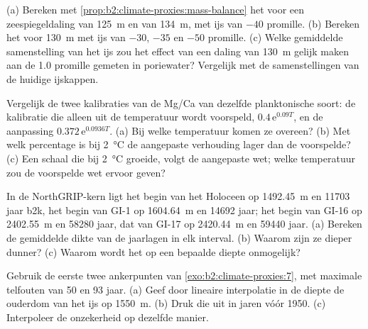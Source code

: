 \begin{exercise}[$\star\star$]\label{exo:b2:climate-proxies:5}
(a) Bereken met \cref{prop:b2:climate-proxies:mass-balance} het  voor een
zeespiegeldaling van \qty{125}{m} en van \qty{134}{m}, met ijs van $-40$ promille. (b) Bereken het voor
\qty{130}{m} met ijs van $-30$, $-35$ en $-50$ promille. (c) Welke gemiddelde samenstelling van het ijs
zou het effect van een daling van \qty{130}{m} gelijk maken aan de \num{1.0} promille gemeten in
poriewater? Vergelijk met de samenstellingen van de huidige ijskappen.
\end{exercise}

\begin{exercise}[$\star\star$]\label{exo:b2:climate-proxies:6}
Vergelijk de twee kalibraties van de Mg/Ca van dezelfde planktonische soort: de kalibratie die alleen uit de
temperatuur wordt voorspeld, $0.4\,\mathrm{e}^{0.09T}$, en de aanpassing $0.372\,\mathrm{e}^{0.0936T}$. (a) Bij
welke temperatuur komen ze overeen? (b) Met welk percentage is bij \qty{2}{\celsius} de aangepaste verhouding
lager dan de voorspelde? (c) Een schaal die bij \qty{2}{\celsius} groeide, volgt de aangepaste wet; welke
temperatuur zou de voorspelde wet ervoor geven?
\end{exercise}

\begin{exercise}[$\star\star$]\label{exo:b2:climate-proxies:7}
In de NorthGRIP-kern ligt het begin van het Holoceen op \qty{1492.45}{m} en \num{11703} jaar
b2k, het begin van GI-1 op \qty{1604.64}{m} en \num{14692} jaar; het begin van GI-16 op
\qty{2402.55}{m} en \num{58280} jaar, dat van GI-17 op \qty{2420.44}{m} en \num{59440} jaar.
(a) Bereken de gemiddelde dikte van de jaarlagen in elk interval. (b) Waarom zijn ze dieper
dunner? (c) Waarom wordt het  op een bepaalde diepte onmogelijk?
\end{exercise}

\begin{exercise}[$\star\star$]\label{exo:b2:climate-proxies:8}
Gebruik de eerste twee ankerpunten van \cref{exo:b2:climate-proxies:7}, met maximale telfouten van 50
en 93 jaar. (a) Geef door lineaire interpolatie in de diepte de ouderdom van het ijs op \qty{1550}{m}.
(b) Druk die uit in jaren vóór 1950. (c) Interpoleer de onzekerheid op dezelfde manier.
\end{exercise}

